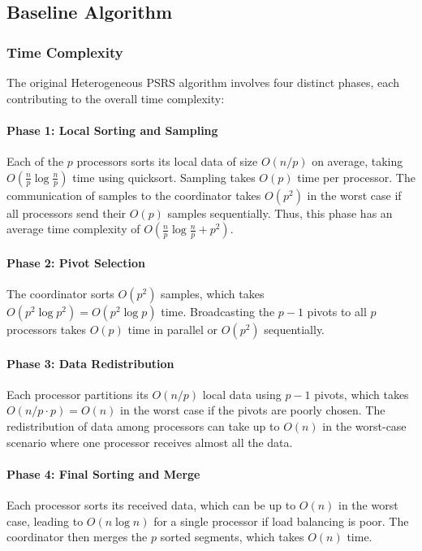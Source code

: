 \documentclass[]{interact}
\theoremstyle{plain}
\theoremstyle{definition}
\theoremstyle{remark}
\begin{document}
\subsection{Baseline Algorithm}

\subsubsection{Time Complexity}
The original Heterogeneous PSRS algorithm involves four distinct phases, each contributing to the overall time complexity:

\paragraph{Phase 1: Local Sorting and Sampling} 
Each of the $p$ processors sorts its local data of size $O(n/p)$ on average, taking $O\left(\frac{n}{p} \log \frac{n}{p}\right)$ time using quicksort. Sampling takes $O(p)$ time per processor. The communication of samples to the coordinator takes $O(p^2)$ in the worst case if all processors send their $O(p)$ samples sequentially. Thus, this phase has an average time complexity of $O\left(\frac{n}{p} \log \frac{n}{p} + p^2\right)$.

\paragraph{Phase 2: Pivot Selection}
The coordinator sorts $O(p^2)$ samples, which takes $O(p^2 \log p^2) = O(p^2 \log p)$ time. Broadcasting the $p - 1$ pivots to all $p$ processors takes $O(p)$ time in parallel or $O(p^2)$ sequentially.

\paragraph{Phase 3: Data Redistribution} Each processor partitions its $O(n/p)$ local data using $p - 1$ pivots, which takes $O(n/p \cdot p) = O(n)$ in the worst case if the pivots are poorly chosen. The redistribution of data among processors can take up to $O(n)$ in the worst-case scenario where one processor receives almost all the data.

\paragraph{Phase 4: Final Sorting and Merge} Each processor sorts its received data, which can be up to $O(n)$ in the worst case, leading to $O(n \log n)$ for a single processor if load balancing is poor. The coordinator then merges the $p$ sorted segments, which takes $O(n)$ time.
\end{document}
